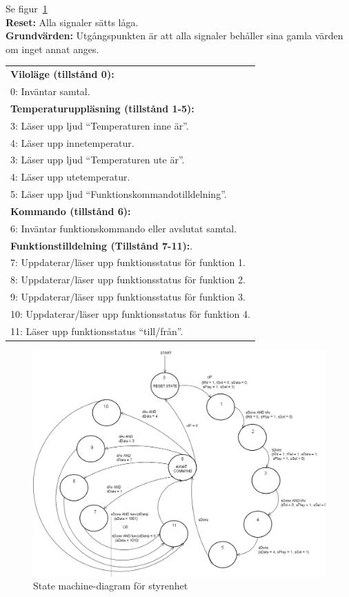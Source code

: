 \documentclass[a4paper,11pt]{article}
\begin{document}
			Se figur~\ref{fig:CUSM}\\
			{\bf Reset:} Alla signaler sätts låga.\\
			{\bf Grundvärden:} Utgångspunkten är att alla signaler behåller sina gamla värden om inget annat anges.\\
			\begin{tabular}{l}
				\\{\bf Viloläge (tillstånd 0):}\\
				0: Inväntar samtal.\\
				{\bf Temperaturuppläsning (tillstånd 1-5):}\\
				3: Läser upp ljud ``Temperaturen inne är''.\\
				4: Läser upp innetemperatur.\\
				3: Läser upp ljud ``Temperaturen ute är''.\\
				4: Läser upp utetemperatur.\\
				5: Läser upp ljud ``Funktionskommandotilldelning''.\\
				{\bf Kommando (tillstånd 6):}\\
				6: Inväntar funktionskommando eller avslutat samtal.\\
				{\bf Funktionstilldelning (Tillstånd 7-11):}.\\
				7: Uppdaterar/läser upp funktionsstatus för funktion 1.\\
				8: Uppdaterar/läser upp funktionsstatus för funktion 2.\\
				9: Uppdaterar/läser upp funktionsstatus för funktion 3.\\
				10: Uppdaterar/läser upp funktionsstatus för funktion 4.\\
				11: Läser upp funktionsstatus ``till/från''.\\
			\end{tabular}

	\begin{figure}[H]
	  \centering
	      \includegraphics[scale=0.4, angle=0]{ControlUnitStateMachineDiagram.png}
	  	\caption{State machine-diagram för styrenhet}
		\label{fig:CUSM}
	\end{figure}
	
\end{document}
